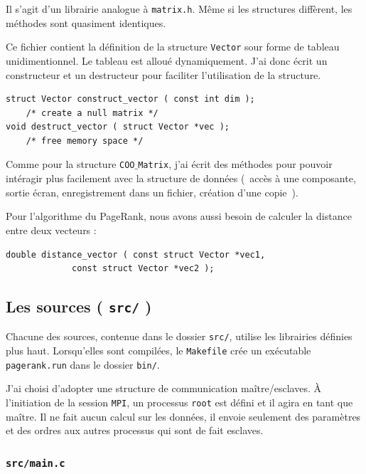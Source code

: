 \documentclass[a4paper,12pt]{article}
\begin{document}
Il s'agit d'un librairie analogue à \texttt{matrix.h}. Même si les structures diffèrent, les méthodes sont quasiment identiques.

\bigskip

Ce fichier contient la définition de la structure \texttt{Vector} sour forme de tableau unidimentionnel. Le tableau est alloué dynamiquement. J'ai donc écrit un constructeur et un destructeur pour faciliter l'utilisation de la structure.

\begin{lstlisting}
struct Vector construct_vector ( const int dim );
	/* create a null matrix */
void destruct_vector ( struct Vector *vec );
	/* free memory space */
\end{lstlisting}

\medskip

Comme pour la structure \texttt{COO$\_$Matrix}, j'ai écrit des méthodes pour pouvoir intéragir plus facilement avec la structure de données (~accès à une composante, sortie écran, enregistrement dans un fichier, création d'une copie~).

Pour l'algorithme du PageRank, nous avons aussi besoin de calculer la distance entre deux vecteurs :

\begin{lstlisting}
double distance_vector ( const struct Vector *vec1, 
			 const struct Vector *vec2 );
\end{lstlisting}

\medskip

\subsection{Les sources ( \texttt{src/} )}

Chacune des sources, contenue dans le dossier \texttt{src/}, utilise les librairies définies plus haut. Lorsqu'elles sont compilées, le \texttt{Makefile} crée un exécutable \texttt{pagerank.run} dans le dossier \texttt{bin/}.

\bigskip

J'ai choisi d'adopter une structure de communication maître/esclaves. À l'initiation de la session \texttt{MPI}, un processus \texttt{root} est défini et il agira en tant que maître. Il ne fait aucun calcul sur les données, il envoie seulement des paramètres et des ordres aux autres processus qui sont de fait esclaves.

\subsubsection{\texttt{src/main.c}}
\end{document}
